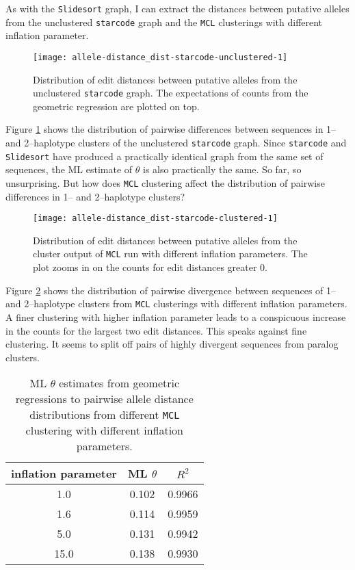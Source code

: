 \documentclass{article}\usepackage[]{graphicx}\usepackage[]{color}
\begin{document}
As with the \texttt{Slidesort} graph, I can extract the distances between putative alleles from the unclustered \texttt{starcode} graph and the \texttt{MCL} clusterings with different inflation parameter. 
\begin{figure}
\centering
\texttt{[image: allele-distance\_dist-starcode-unclustered-1]}
\caption{Distribution of edit distances between putative alleles from the unclustered \texttt{starcode} graph. The expectations of counts from the geometric regression are plotted on top.}
\label{Fig:allele-distance_dist-starcode-unclustered}
\end{figure}
Figure \ref{Fig:allele-distance_dist-starcode-unclustered} shows the distribution of pairwise differences between sequences in 1-- and 2--haplotype clusters of the unclustered \texttt{starcode} graph. Since \texttt{starcode} and \texttt{Slidesort} have produced a practically identical graph from the same set of sequences, the ML estimate of $\theta$ is also practically the same. So far, so unsurprising. But how does \texttt{MCL} clustering affect the distribution of pairwise differences in 1-- and 2--haplotype clusters?
\begin{figure}
\centering
\texttt{[image: allele-distance\_dist-starcode-clustered-1]}
\caption{Distribution of edit distances between putative alleles from the cluster output of \texttt{MCL} run with different inflation parameters. The plot zooms in on the counts for edit distances greater 0.}
\label{Fig:allele-distance_dist-starcode-clustered}
\end{figure}
Figure \ref{Fig:allele-distance_dist-starcode-clustered} shows the distribution of pairwise divergence between sequences of 1-- and 2--haplotype clusters from \texttt{MCL} clusterings with different inflation parameters. A finer clustering with higher inflation parameter leads to a conspicuous increase in the counts for the largest two edit distances. This speaks against fine clustering. It seems to split off pairs of highly divergent sequences from paralog clusters. ~
\begin{table}[htdp]
\centering
\caption{ML $\theta$ estimates from geometric regressions to pairwise allele distance distributions from different \texttt{MCL} clustering with different inflation parameters.}
\begin{tabular}{ccc}
inflation parameter & ML $\theta$ & $R^{2}$ \\
\toprule
1.0 & 0.102 & 0.9966 \\
1.6 & 0.114 & 0.9959 \\
5.0 & 0.131 & 0.9942 \\
15.0 & 0.138 & 0.9930 \\
\bottomrule
\end{tabular}
\label{Tab:inflation-theta}
\end{table}%
\end{document}
